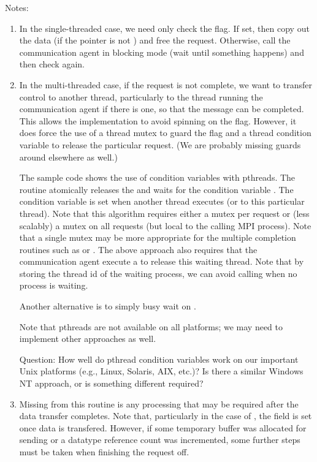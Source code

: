 Notes:
\begin{enumerate}
\item In the single-threaded case, we need only check the
   flag. 
  If set, then copy out the  data (if the 
  pointer is not ) and free the request.  Otherwise, 
  call the communication agent in blocking mode (wait until something happens)
  and then check again.

\item In the multi-threaded case, if the request is not complete, we want to
  transfer control to another thread, particularly to the thread running the
  communication agent if there is one, so that the message can be completed.
  This allows the implementation to avoid spinning on the
   flag.  However, it does force the use of a thread mutex to guard the
   flag and a thread condition variable to release the
  particular request.  (We are probably missing guards around 
  elsewhere as well.)

  The sample code shows the use of condition variables with pthreads.
  The routine  atomically releases the
   and 
  waits for the condition variable .  The condition variable is set
  when another thread executes  (or
   to this particular thread).
  Note that this algorithm requires either a mutex per request or (less
  scalably) a mutex 
  on all requests (but local to the calling MPI process).  
  Note that a single mutex may be more appropriate for the multiple completion
  routines such as  or .
  The above approach also requires that the communication agent execute a
   to release this waiting thread.  Note that by
  storing the thread id of the waiting process, we can avoid calling
   when no process is waiting.

  Another alternative is to simply busy wait on .
  
  Note that pthreads are not available on all platforms; we may need to
  implement other approaches as well.
  
  Question: How well do pthread condition variables work on our important Unix
  platforms (e.g., Linux, Solaris, AIX, etc.)?  Is there a similar Windows NT
  approach, or is something different required?

\item Missing from this routine is any processing that may be required after
  the data transfer completes.  Note that, particularly in the case of
  , the  field is set once data is
  transfered.  However, if some temporary buffer was allocated for sending or
  a datatype reference count was incremented, some further steps must be taken
  when finishing the request off.
\end{enumerate}

